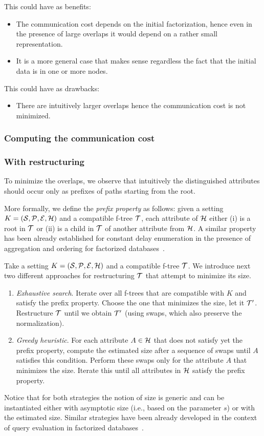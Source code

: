 This could have as benefits:
\begin{itemize}
\item The communication cost depends on the initial factorization, hence even in the presence of large overlaps it would depend on a rather small representation.
\item It is a more general case that makes sense regardless the fact that the initial data is in one or more nodes.
\end{itemize}

This could have as drawbacks:
\begin{itemize}
\item There are intuitively larger overlaps hence the communication cost is not minimized.
\end{itemize}



\subsubsection{Computing the communication cost}


\subsubsection{With restructuring}
To minimize the overlaps, we observe that intuitively the distinguished attributes should occur only as prefixes of paths starting from the root.

More formally, we define the {\em prefix property} as follows: given a setting $K=(\mathcal S,\mathcal P,\mathcal E,\mathcal{H})$ and a compatible f-tree $\mathcal T$, each attribute of $\mathcal{H}$ either (i) is a root in $\mathcal T$ or (ii) is a child in $\mathcal T$ of another attribute from $\mathcal{H}$.
A similar property has been already established for constant delay enumeration in the presence of aggregation and ordering for factorized databases~\cite{BKOZ13}.

Take a setting $K = (\mathcal S, \mathcal P, \mathcal E, \mathcal{H})$ and a compatible f-tree $\mathcal T$.
We introduce next two different approaches for restructuring $\mathcal T$ that attempt to minimize its size.

\begin{enumerate}
\item {\em Exhaustive search}.
Iterate over all f-trees that are compatible with $K$ and satisfy the prefix property.
Choose the one that minimizes the size, let it $\mathcal T'$.
Restructure $\mathcal T$ until we obtain $\mathcal T'$ (using swaps, which also preserve the normalization).

\item {\em Greedy heuristic}.
For each attribute $A\in\mathcal{H}$ that does not satisfy yet the prefix property, compute the estimated size after a sequence of swaps until $A$ satisfies this condition.
Perform these swaps only for the attribute $A$ that minimizes the size.
Iterate this until all attributes in $\mathcal{H}$ satisfy the prefix property.
\end{enumerate}
Notice that for both strategies the notion of size is generic and can be instantiated either with asymptotic size (i.e., based on the parameter $s$) or with the estimated size.
Similar strategies have been already developed in the context of query evaluation in factorized databases~\cite{BaOlZa12}.


